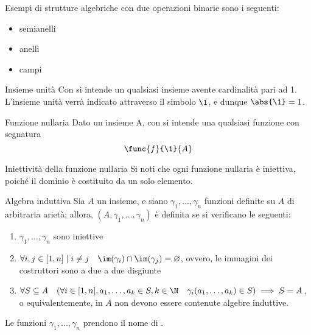 \documentclass[a4paper, 12pt]{report}
\begin{document}
    \begin{example}[Algebre]
        Esempi di strutture algebriche con due operazioni binarie sono i seguenti:

        \begin{itemize}
            \item semianelli
            \item anelli
            \item campi
        \end{itemize}
    \end{example}

    \begin{frameddefn}{Insieme unità}
        Con  si intende un qualsiasi insieme avente cardinalità pari ad 1. L'insieme unità verrà indicato attraverso il simbolo $\1$, e dunque $\abs{\1} = 1$.
    \end{frameddefn}

    \begin{frameddefn}{Funzione nullaria}
        Dato un insieme A, con  si intende una qualsiasi funzione con segnatura $$\func{f}{\1}{A}$$
    \end{frameddefn}

    \begin{framedobs}[label={inj null}]{Iniettività della funzione nullaria}
        Si noti che ogni funzione nullaria è iniettiva, poiché il dominio è costituito da un solo elemento.
    \end{framedobs}

    \begin{frameddefn}[label={inductive algebra}]{Algebra induttiva}
        Sia $A$ un insieme, e siano $\gamma_1, \ldots, \gamma_n$ funzioni definite su $A$ di arbitraria arietà; allora, $(A, \gamma_1, \ldots, \gamma_n)$ è definita  se si verificano le seguenti:

        \begin{enumerate}[label=\roman*), font=\itshape]
            \item $\gamma_1, \ldots, \gamma_n$ sono iniettive
            \item $\forall i, j \in [1, n] \mid i \neq j \quad \im(\gamma_i) \cap \im(\gamma_j) = \varnothing$, ovvero, le immagini dei costruttori sono a due a due disgiunte
            \item $\forall S \subseteq A \quad (\forall i \in [1, n], a_1, \ldots, a_k \in S, k \in \N  \quad \gamma_i(a_1, \ldots, a_k) \in S) \implies S = A$, o equivalentemente, in $A$ non devono essere contenute algebre induttive.
        \end{enumerate}

        Le funzioni $\gamma_1, \ldots, \gamma_n$ prendono il nome di .
    \end{frameddefn}
\end{document}
